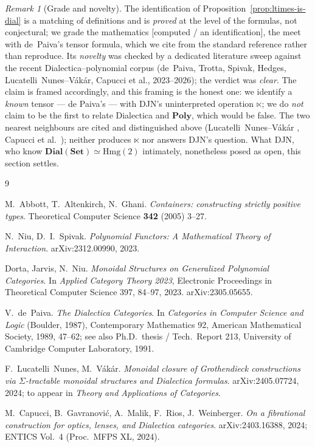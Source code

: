 \documentclass[11pt,a4paper]{article}
\newcommand{\Set}{\mathbf{Set}}
\newcommand{\Poly}{\mathbf{Poly}}
\newcommand{\Dial}{\mathbf{Dial}}
\newcommand{\Hmg}{\mathrm{Hmg}}
\theoremstyle{plain}
\theoremstyle{definition}
\theoremstyle{remark}
\newtheorem{Remark}[Theorem]{Remark}
\begin{document}
\begin{Remark}[Grade and novelty]
\label{rem:dia-grade}
The identification of Proposition~\ref{prop:ltimes-is-dial} is a matching of
definitions and is \emph{proved} at the level of the formulas, not conjectural;
we grade the mathematics \textsf{[computed / an identification]}, the meet with
de~Paiva's tensor formula, which we cite from the standard reference
\cite{depaiva89} rather than reproduce. Its \emph{novelty} was checked by a
dedicated literature sweep against the recent Dialectica--polynomial corpus
(de~Paiva, Trotta, Spivak, Hedges, Lucatelli~Nunes--Vákár, Capucci et al.,
2023--2026); the verdict was \emph{clear}. The claim is framed accordingly, and
this framing is the honest one: we identify a \emph{known} tensor --- de Paiva's
--- with DJN's uninterpreted operation $\ltimes$; we do \emph{not} claim to be
the first to relate Dialectica and $\Poly$, which would be false. The two nearest
neighbours are cited and distinguished above (Lucatelli~Nunes--Vákár
\cite{lnv2405}, Capucci et al.\ \cite{capucci2024}); neither produces $\ltimes$
nor answers DJN's question. What DJN, who know $\Dial(\Set)\simeq\Hmg(2)$
intimately, nonetheless posed as open, this section settles.
\end{Remark}


\begin{thebibliography}{9}

 M.~Abbott, T.~Altenkirch, N.~Ghani.
  \emph{Containers: constructing strictly positive types}.
  Theoretical Computer Science \textbf{342} (2005) 3--27.

 N.~Niu, D.~I.~Spivak.
  \emph{Polynomial Functors: A Mathematical Theory of Interaction}.
  arXiv:2312.00990, 2023.

 Dorta, Jarvis, N.~Niu.
  \emph{Monoidal Structures on Generalized Polynomial Categories}.
  In \emph{Applied Category Theory 2023}, Electronic Proceedings in Theoretical
  Computer Science 397, 84--97, 2023. arXiv:2305.05655.

 V.~de~Paiva.
  \emph{The Dialectica Categories}.
  In \emph{Categories in Computer Science and Logic} (Boulder, 1987),
  Contemporary Mathematics 92, American Mathematical Society, 1989, 47--62;
  see also Ph.D.\ thesis / Tech.\ Report 213, University of Cambridge Computer
  Laboratory, 1991.

 F.~Lucatelli~Nunes, M.~V\'ak\'ar.
  \emph{Monoidal closure of Grothendieck constructions via
  $\Sigma$-tractable monoidal structures and Dialectica formulas}.
  arXiv:2405.07724, 2024; to appear in \emph{Theory and Applications of
  Categories}.

 M.~Capucci, B.~Gavranovi\'c, A.~Malik, F.~Rios,
  J.~Weinberger.
  \emph{On a fibrational construction for optics, lenses, and Dialectica
  categories}.
  arXiv:2403.16388, 2024; ENTICS Vol.\ 4 (Proc.\ MFPS XL, 2024).

\end{thebibliography}
\end{document}
